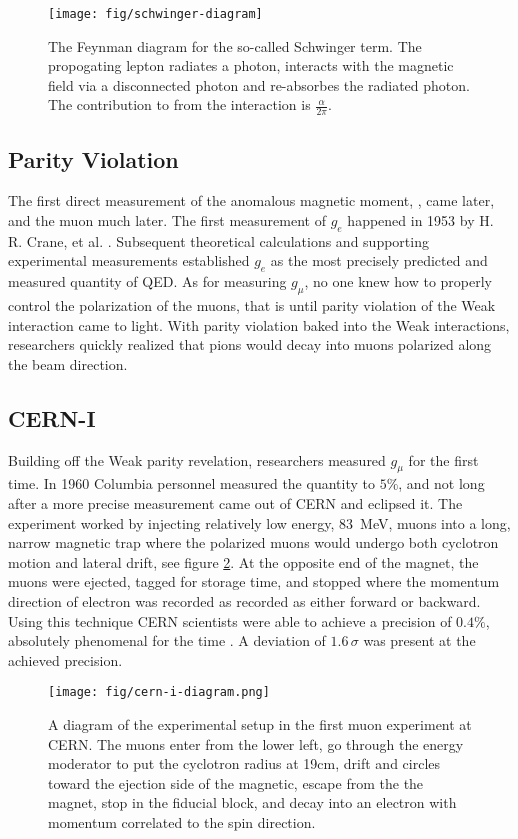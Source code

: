 \begin{figure}
\label{fig:schwinger-diagram}
\centering
\texttt{[image: fig/schwinger-diagram]}
\caption{The Feynman diagram for the so-called Schwinger term. The propogating lepton radiates a photon, interacts with the magnetic field via a disconnected photon and re-absorbes the radiated photon.  The contribution to \gmtwo from the interaction is $\frac{\alpha}{2\pi}$.}
\end{figure}

\subsection{Parity Violation}
The first direct measurement of the anomalous magnetic moment, \gmtwo, came later, and the muon \gmtwo much later.  The first measurement of $g_e$ happened in 1953 by H. R. Crane, et al. .  Subsequent theoretical calculations and supporting experimental measurements established $g_e$ as the most precisely predicted and measured quantity of QED.  As for measuring $g_\mu$, no one knew how to properly control the polarization of the muons, that is until parity violation of the Weak interaction came to light.  With parity violation baked into the Weak interactions, researchers quickly realized that pions would decay into muons polarized along the beam direction.  

\subsection{CERN-I}
Building off the Weak parity revelation, researchers measured $g_\mu$ for the first time.  In 1960 Columbia personnel measured the quantity to $5\%$, and not long after a more precise measurement came out of CERN and eclipsed it.  The experiment worked by injecting relatively low energy, \SI{83}{\MeV}, muons into a long, narrow magnetic trap where the polarized muons would undergo both cyclotron motion and lateral drift, see figure \ref{fig:cern-i-diagram}. At the opposite end of the magnet, the muons were ejected, tagged for storage time, and stopped where the momentum direction of electron was recorded as recorded as either forward or backward.  Using this technique CERN scientists were able to achieve a precision of $0.4\%$, absolutely phenomenal for the time \cite{cern-i}.  A deviation of $1.6\,\sigma$ was present at the achieved precision.

\begin{figure}
\centering
\texttt{[image: fig/cern-i-diagram.png]}
\label{fig:cern-i-diagram}
\caption{A diagram of the experimental setup in the first muon \gmtwo experiment at CERN. The muons enter from the lower left, go through the energy moderator to put the cyclotron radius at 19cm, drift and circles toward the ejection side of the magnetic, escape from the the magnet, stop in the fiducial block, and decay into an electron with momentum correlated to the spin direction.}
\end{figure}

